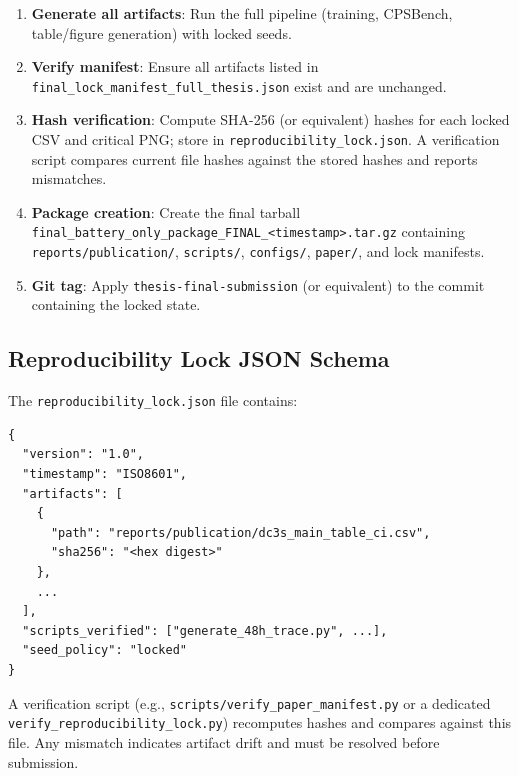 \begin{enumerate}
\item \textbf{Generate all artifacts}: Run the full pipeline (training, CPSBench, table/figure generation) with locked seeds.
\item \textbf{Verify manifest}: Ensure all artifacts listed in \texttt{final\_lock\_manifest\_full\_thesis.json} exist and are unchanged.
\item \textbf{Hash verification}: Compute SHA-256 (or equivalent) hashes for each locked CSV and critical PNG; store in \texttt{reproducibility\_lock.json}. A verification script compares current file hashes against the stored hashes and reports mismatches.
\item \textbf{Package creation}: Create the final tarball \texttt{final\_battery\_only\_package\_FINAL\_<timestamp>.tar.gz} containing \texttt{reports/publication/}, \texttt{scripts/}, \texttt{configs/}, \texttt{paper/}, and lock manifests.
\item \textbf{Git tag}: Apply \texttt{thesis-final-submission} (or equivalent) to the commit containing the locked state.
\end{enumerate}

\subsection{Reproducibility Lock JSON Schema}

The \texttt{reproducibility\_lock.json} file contains:

\begin{verbatim}
{
  "version": "1.0",
  "timestamp": "ISO8601",
  "artifacts": [
    {
      "path": "reports/publication/dc3s_main_table_ci.csv",
      "sha256": "<hex digest>"
    },
    ...
  ],
  "scripts_verified": ["generate_48h_trace.py", ...],
  "seed_policy": "locked"
}
\end{verbatim}

A verification script (e.g., \texttt{scripts/verify\_paper\_manifest.py} or a dedicated \texttt{verify\_reproducibility\_lock.py}) recomputes hashes and compares against this file. Any mismatch indicates artifact drift and must be resolved before submission.
